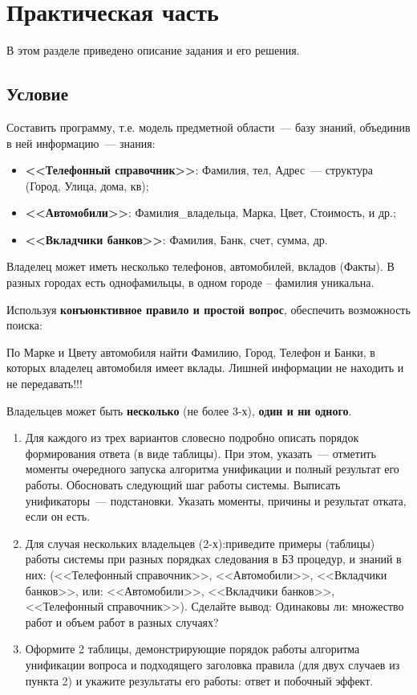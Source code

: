 \chapter{Практическая часть}
В этом разделе приведено описание задания и его решения.

\section{Условие}
Составить программу, т.е. модель предметной области~--- базу знаний, объединив в ней информацию~--- знания:
\begin{itemize}
    \item \textbf{<<Телефонный справочник>>}: Фамилия, \textnumero{}тел, Адрес~--- структура (Город, Улица, \textnumero{}дома, \textnumero{}кв);
    \item \textbf{<<Автомобили>>}:  Фамилия\_владельца, Марка, Цвет, Стоимость, и др.;
    \item \textbf{<<Вкладчики банков>>}: Фамилия, Банк, счет, сумма, др.
\end{itemize}

Владелец может иметь несколько телефонов, автомобилей, вкладов (Факты). В разных городах есть однофамильцы, в одном городе – фамилия уникальна.

Используя \textbf{конъюнктивное правило и простой вопрос}, обеспечить возможность поиска:

По Марке и Цвету автомобиля найти Фамилию, Город, Телефон и Банки, в которых владелец автомобиля имеет вклады. Лишней информации не находить и не передавать!!!

Владельцев может быть \textbf{несколько} (не более 3-х), \textbf{один и ни одного}.
\begin{enumerate}
    \item Для каждого из трех вариантов словесно подробно описать порядок формирования ответа (в виде таблицы). При этом, указать~--– отметить моменты очередного запуска алгоритма унификации и полный результат его работы. Обосновать следующий шаг работы системы. Выписать унификаторы~--– подстановки. Указать моменты, причины и результат отката, если он есть.

    \item Для случая нескольких владельцев (2-х):\newline{}приведите примеры (таблицы) работы системы при разных порядках следования в БЗ процедур, и знаний в них: (<<Телефонный справочник>>, <<Автомобили>>, <<Вкладчики банков>>, или: <<Автомобили>>, <<Вкладчики банков>>, <<Телефонный справочник>>). Сделайте вывод: Одинаковы ли: множество работ и объем работ в разных случаях?

    \item Оформите 2 таблицы, демонстрирующие порядок работы алгоритма унификации вопроса и подходящего заголовка правила (для двух случаев из пункта 2) и укажите результаты его работы: ответ и побочный эффект.
\end{enumerate}

